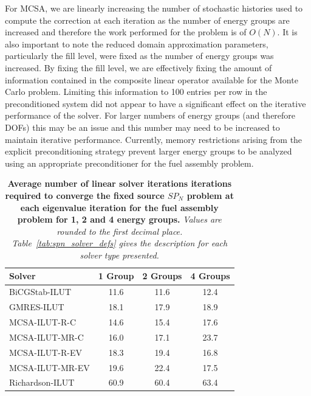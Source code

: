 For MCSA, we are linearly increasing the number of stochastic
histories used to compute the correction at each iteration as the
number of energy groups are increased and therefore the work performed
for the problem is of $O(N)$. It is also important to note the reduced
domain approximation parameters, particularly the fill level, were
fixed as the number of energy groups was increased. By fixing the fill
level, we are effectively fixing the amount of information contained
in the composite linear operator available for the Monte Carlo
problem. Limiting this information to 100 entries per row in the
preconditioned system did not appear to have a significant effect on
the iterative performance of the solver. For larger numbers of energy
groups (and therefore DOFs) this may be an issue and this number may
need to be increased to maintain iterative performance. Currently,
memory restrictions arising from the explicit preconditioning strategy
prevent larger energy groups to be analyzed using an appropriate
preconditioner for the fuel assembly problem.

\begin{table}[h!]
  \begin{center}
    \begin{tabular}{lccc}\hline\hline
      \multicolumn{1}{l}{Solver}&
      \multicolumn{1}{c}{1 Group}&
      \multicolumn{1}{c}{2 Groups}&
      \multicolumn{1}{c}{4 Groups}\\
      \hline
      BiCGStab-ILUT & 11.6 & 11.6 & 12.4 \\ 
      GMRES-ILUT & 18.1 & 17.9 & 18.9 \\
      MCSA-ILUT-R-C & 14.6 & 15.4 & 17.6 \\
      MCSA-ILUT-MR-C & 16.0 & 17.1 & 23.7 \\
      MCSA-ILUT-R-EV & 18.3 & 19.4 & 16.8 \\
      MCSA-ILUT-MR-EV & 19.6 & 22.4 & 17.5 \\
      Richardson-ILUT & 60.9 & 60.4 & 63.4 \\
      \hline\hline
    \end{tabular}
  \end{center}
  \caption{\textbf{Average number of linear solver iterations
      iterations required to converge the fixed source $SP_N$ problem
      at each eigenvalue iteration for the fuel assembly problem for
      1, 2 and 4 energy groups.} \textit{Values are rounded to the
      first decimal place. Table~\ref{tab:spn_solver_defs} gives the
      description for each solver type presented.}}
  \label{tab:spn_comparison_iterations}
\end{table}

